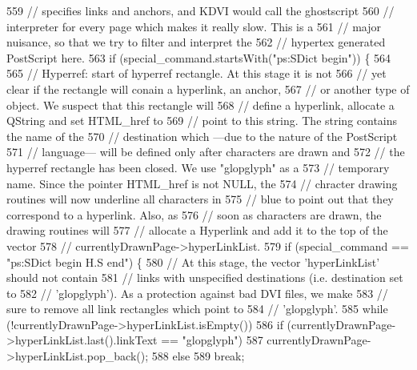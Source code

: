 \begin{DoxyCode}
559   \textcolor{comment}{// specifies links and anchors, and KDVI would call the ghostscript}
560   \textcolor{comment}{// interpreter for every page which makes it really slow. This is a}
561   \textcolor{comment}{// major nuisance, so that we try to filter and interpret the}
562   \textcolor{comment}{// hypertex generated PostScript here.}
563   \textcolor{keywordflow}{if} (special\_command.startsWith(\textcolor{stringliteral}{"ps:SDict begin"})) \{
564 
565     \textcolor{comment}{// Hyperref: start of hyperref rectangle. At this stage it is not}
566     \textcolor{comment}{// yet clear if the rectangle will conain a hyperlink, an anchor,}
567     \textcolor{comment}{// or another type of object. We suspect that this rectangle will}
568     \textcolor{comment}{// define a hyperlink, allocate a QString and set HTML\_href to}
569     \textcolor{comment}{// point to this string. The string contains the name of the}
570     \textcolor{comment}{// destination which ---due to the nature of the PostScript}
571     \textcolor{comment}{// language--- will be defined only after characters are drawn and}
572     \textcolor{comment}{// the hyperref rectangle has been closed. We use "glopglyph" as a}
573     \textcolor{comment}{// temporary name. Since the pointer HTML\_href is not NULL, the}
574     \textcolor{comment}{// chracter drawing routines will now underline all characters in}
575     \textcolor{comment}{// blue to point out that they correspond to a hyperlink. Also, as}
576     \textcolor{comment}{// soon as characters are drawn, the drawing routines will}
577     \textcolor{comment}{// allocate a Hyperlink and add it to the top of the vector}
578     \textcolor{comment}{// currentlyDrawnPage->hyperLinkList.}
579     \textcolor{keywordflow}{if} (special\_command == \textcolor{stringliteral}{"ps:SDict begin H.S end"}) \{
580       \textcolor{comment}{// At this stage, the vector 'hyperLinkList' should not contain}
581       \textcolor{comment}{// links with unspecified destinations (i.e. destination set to}
582       \textcolor{comment}{// 'glopglyph'). As a protection against bad DVI files, we make}
583       \textcolor{comment}{// sure to remove all link rectangles which point to}
584       \textcolor{comment}{// 'glopglyph'.}
585       \textcolor{keywordflow}{while} (!currentlyDrawnPage->hyperLinkList.isEmpty())
586         \textcolor{keywordflow}{if} (currentlyDrawnPage->hyperLinkList.last().linkText == \textcolor{stringliteral}{"glopglyph"})
587           currentlyDrawnPage->hyperLinkList.pop\_back();
588         \textcolor{keywordflow}{else}
589           \textcolor{keywordflow}{break};

\end{DoxyCode}

